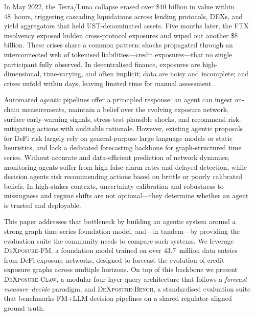 
In May 2022, the Terra/Luna collapse erased over \$40 billion in value within 48~hours, triggering cascading liquidations across lending protocols, DEXs, and yield aggregators that held UST-denominated assets. Five months later, the FTX insolvency exposed hidden cross-protocol exposures and wiped out another \$8 billion. These crises share a common pattern: shocks propagated through an interconnected web of tokenised liabilities---credit exposures---that no single participant fully observed. In decentralised finance, exposures are high-dimensional, time-varying, and often implicit; data are noisy and incomplete; and crises unfold within days, leaving limited time for manual assessment.

Automated \emph{agentic} pipelines offer a principled response: an agent can ingest on-chain measurements, maintain a belief over the evolving exposure network, surface early-warning signals, stress-test plausible shocks, and recommend risk-mitigating actions with auditable rationale. However, existing agentic proposals for DeFi risk largely rely on general-purpose large language models or static heuristics, and lack a dedicated forecasting backbone for graph-structured time series. Without accurate and data-efficient prediction of network dynamics, monitoring agents suffer from high false-alarm rates and delayed detection, while decision agents risk recommending actions based on brittle or poorly calibrated beliefs. In high-stakes contexts, uncertainty calibration and robustness to missingness and regime shifts are not optional---they determine whether an agent is trusted and deployable.

This paper addresses that bottleneck by building an agentic system around a strong graph time-series foundation model, and---in tandem---by providing the evaluation suite the community needs to compare such systems. We leverage \textsc{DeXposure-FM}, a foundation model trained on over $43.7$~million data entries from DeFi exposure networks, designed to forecast the evolution of credit-exposure graphs across multiple horizons. On top of this backbone we present \textsc{DeXposure-Claw}, a modular four-layer query architecture that follows a \emph{forecast--measure--decide} paradigm, and \textsc{DeXposure-Bench}, a standardised evaluation suite that benchmarks FM+LLM decision pipelines on a shared regulator-aligned ground truth.

